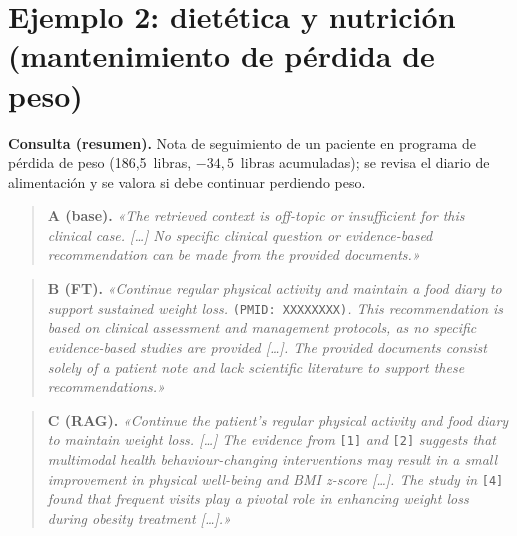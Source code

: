 \documentclass[11pt,a4paper,spanish]{book}
\numberwithin{equation}{chapter}
\numberwithin{figure}{chapter}
\begin{document}
\section{Ejemplo 2: dietética y nutrición (mantenimiento de pérdida de peso)}
\label{anexo:cualitativo_ej2}

\textbf{Consulta (resumen).} Nota de seguimiento de un paciente en programa de pérdida de peso (186{,}5~libras, $-34{,}5$~libras acumuladas); se revisa el diario de alimentación y se valora si debe continuar perdiendo peso.

\begin{quote}\small
\textbf{A (base).} \emph{«The retrieved context is off-topic or insufficient for this clinical case. [\ldots] No specific clinical question or evidence-based recommendation can be made from the provided documents.»}
\end{quote}

\begin{quote}\small
\textbf{B (FT).} \emph{«Continue regular physical activity and maintain a food diary to support sustained weight loss.} \texttt{(PMID: XXXXXXXX)}\emph{. This recommendation is based on clinical assessment and management protocols, as no specific evidence-based studies are provided [\ldots]. The provided documents consist solely of a patient note and lack scientific literature to support these recommendations.»}
\end{quote}

\begin{quote}\small
\textbf{C (RAG).} \emph{«Continue the patient's regular physical activity and food diary to maintain weight loss. [\ldots] The evidence from} \texttt{[1]} \emph{and} \texttt{[2]} \emph{suggests that multimodal health behaviour-changing interventions may result in a small improvement in physical well-being and BMI z-score [\ldots]. The study in} \texttt{[4]} \emph{found that frequent visits play a pivotal role in enhancing weight loss during obesity treatment [\ldots].»}
\end{quote}
\end{document}

